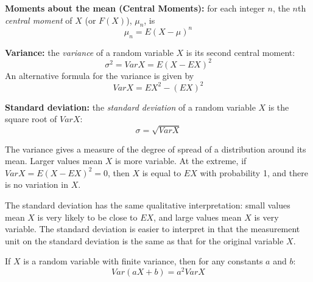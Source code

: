 \begin{definition}
	\textbf{Moments about the mean (Central Moments):} for each integer $n$, the $n$th \textit{central moment} of $X$ (or $F(X)$), $\mu_n$, is
	\[
		\mu_n = E(X - \mu)^n
	\]
\end{definition}

\begin{definition}
	\textbf{Variance:} the \textit{variance} of a random variable $X$ is its second central moment:
	\[
		\sigma^2 = VarX = E(X - EX)^2
	\]
	An alternative formula for the variance is given by
	\[
		VarX = EX^2 - (EX)^2
	\]
\end{definition}

\begin{definition}
	\textbf{Standard deviation:} the \textit{standard deviation} of a random variable $X$ is the square root of $Var X$:
	\[
		\sigma = \sqrt{VarX}
	\]
\end{definition}

The variance gives a measure of the degree of spread of a distribution around its mean. Larger values mean $X$ is more variable. At the extreme, if $VarX = E(X - EX)^2 = 0$, then $X$ is equal to $EX$ with probability 1, and there is no variation in $X$.

The standard deviation has the same qualitative interpretation: small values mean $X$ is very likely to be close to $EX$, and large values mean $X$ is very variable. The standard deviation is easier to interpret in that the measurement unit on the standard deviation is the same as that for the original variable $X$.

\begin{theorem}
	If $X$ is a random variable with finite variance, then for any constants $a$ and $b$:
	\[
		Var(aX + b) = a^2 VarX
	\]
\end{theorem}

\begin{definition}
	\textbf{}
\end{definition}
\begin{definition}
	\textbf{}
\end{definition}